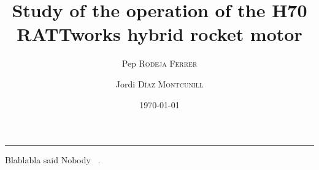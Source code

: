 \documentclass[paper=a4, fontsize=11pt]{scrartcl}
\title{Study of the operation of the H70 RATTworks hybrid rocket motor} %
\author{Pep \textsc{Rodeja Ferrer} \and Jordi \textsc{Díaz Montcunill}} %
\date{\today} %
\numberwithin{equation}{section}    %
\numberwithin{figure}{section}      %
\numberwithin{table}{section}        %
\newcommand{\horrule}[1]{\rule{\linewidth}{#1}}   %
\begin{document}
\maketitle %
\horrule{0.5pt}







Blablabla said Nobody ~\cite{Nobody06}.

{}

\end{document}
